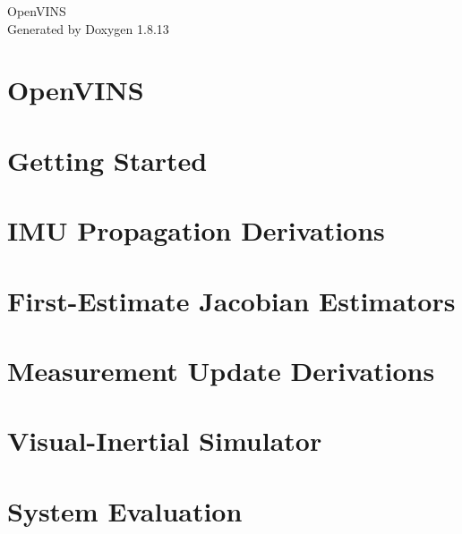 \documentclass[twoside]{book}
\newcommand{\+}{\discretionary{\mbox{\scriptsize$\hookleftarrow$}}{}{}}
\newcommand{\clearemptydoublepage}{%
  \newpage{\pagestyle{empty}\cleardoublepage}%
}
\begin{document}
\hypersetup{pageanchor=false,
             bookmarksnumbered=true,
             pdfencoding=unicode
            }
\begin{titlepage}
\vspace*{7cm}
\begin{center}%
{\Large Open\+V\+I\+NS }\\
\vspace*{1cm}
{\large Generated by Doxygen 1.8.13}\\
\end{center}
\end{titlepage}
\clearemptydoublepage
{}
\tableofcontents
\clearemptydoublepage
{}
\hypersetup{pageanchor=true}

\chapter{Open\+V\+I\+NS}
\label{index}\hypertarget{index}{}
\chapter{Getting Started}
\label{getting-started}

\chapter{I\+MU Propagation Derivations}
\label{propagation}

\chapter{First-\/\+Estimate Jacobian Estimators}
\label{fej}

\chapter{Measurement Update Derivations}
\label{update}

\chapter{Visual-\/\+Inertial Simulator}
\label{simulation}

\chapter{System Evaluation}
\label{evaluation}

\end{document}
